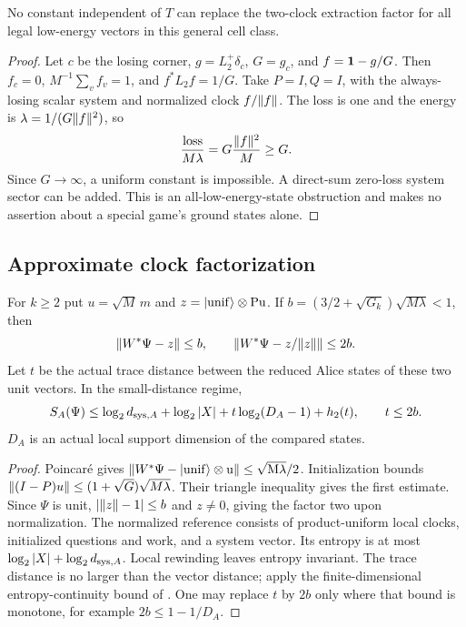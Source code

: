 \begin{proposition}\label{prop:lognecessary}
No constant independent of $T$ can replace the two-clock extraction
factor for all legal low-energy vectors in this general cell class.
\end{proposition}
\begin{proof}
Let $c$ be the losing corner, $g=L_2^+\delta_c$, $G=g_c$, and
$f=\mathbf 1-g/G$. Then $f_c=0$, $M^{-1}\sum_v f_v=1$, and
$f^*L_2f=1/G$. Take $P=I,Q=I$, with the always-losing scalar
system and normalized clock $f/\lVert f\rVert$. The loss is one and the
energy is $\lambda=1/(G\lVert f\rVert^2)$, so
\[
 \frac{\text{loss}}{M\lambda}=G\frac{\lVert f\rVert^2}{M}\geq G.
\]
Since $G\to\infty$, a uniform constant is impossible. A direct-sum
zero-loss system sector can be added. This is an all-low-energy-state
obstruction and makes no assertion about a special game's ground
states alone.
\end{proof}

\subsection{Approximate clock factorization}\label{sec:factorization}
\begin{proposition}\label{prop:factorization}
For $k\geq2$ put $u=\sqrt M\,m$ and
$z=\lvert\rm unif\rangle\otimes Pu$. If
$b=(3/2+\sqrt{G_k})\sqrt{M\lambda}<1$, then
\[
 \lVert W^*\Psi-z\rVert\leq b,\qquad
 \lVert W^*\Psi-z/\lVert z\rVert\rVert\leq2b.
\]
Let $t$ be the actual trace distance between the reduced Alice states
of these two unit vectors. In the small-distance regime,
\begin{equation}\label{eq:entropyupper}
 S_A(\Psi)\leq\log_2d_{{\rm sys},A}+\log_2|X|
                   +t\log_2(D_A-1)+h_2(t),\qquad t\leq2b.
\end{equation}
$D_A$ is an actual local support dimension of the compared states.
\end{proposition}
\begin{proof}
Poincar\'e gives
$\lVert W^*\Psi-\lvert\rm unif\rangle\otimes u\rVert\leq\sqrt{M\lambda}/2$.
Initialization bounds $\lVert(I-P)u\rVert\leq(1+\sqrt G)\sqrt{M\lambda}$.
Their triangle inequality gives the first estimate. Since $\Psi$ is
unit, $|\lVert z\rVert-1|\leq b$ and $z\ne0$, giving the factor two upon
normalization. The normalized reference consists of product-uniform
local clocks, initialized questions and work, and a system vector.
Its entropy is at most $\log_2|X|+\log_2d_{{\rm sys},A}$.
Local rewinding leaves entropy invariant. The trace distance is no
larger than the vector distance; apply the finite-dimensional
entropy-continuity bound of \cite{audenaert}. One may replace $t$
by $2b$ only where that bound is monotone, for example
$2b\leq1-1/D_A$.
\end{proof}

